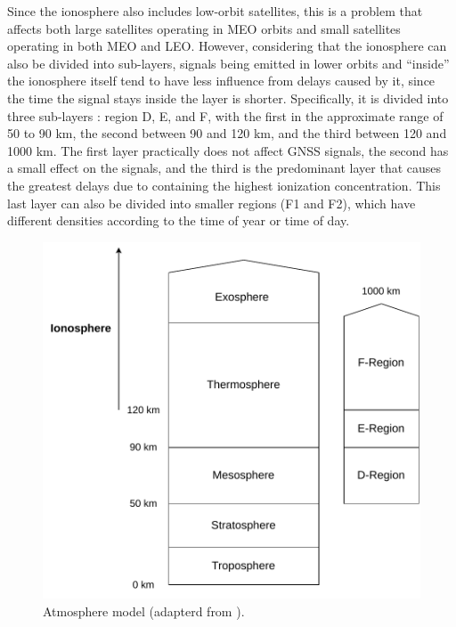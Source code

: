 Since the ionosphere also includes low-orbit satellites, this is a problem that affects both large satellites operating in MEO orbits and small satellites operating in both MEO and LEO. However, considering that the ionosphere can also be divided into sub-layers, signals being emitted in lower orbits and ``inside'' the ionosphere itself tend to have less influence from delays caused by it, since the time the signal stays inside the layer is shorter. Specifically, it is divided into three sub-layers \cite{geog862}: region D, E, and F, with the first in the approximate range of 50 to 90 km, the second between 90 and 120 km, and the third between 120 and 1000 km. The first layer practically does not affect GNSS signals, the second has a small effect on the signals, and the third is the predominant layer that causes the greatest delays due to containing the highest ionization concentration. This last layer can also be divided into smaller regions (F1 and F2), which have different densities according to the time of year or time of day.

\begin{figure}[!ht]
    \begin{center}
        \includegraphics[width=0.6\columnwidth]{figures/atmosphere-model.pdf}
        \caption{Atmosphere model (adapterd from \cite{geog862}).}
        \label{fig:atmosphere-model}
    \end{center}
\end{figure}


